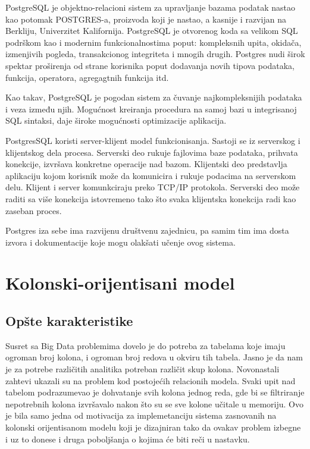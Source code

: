 \documentclass[12pt,oneside]{memoir}
\begin{document}
PostgreSQL je objektno-relacioni sistem za upravljanje bazama podatak nastao kao potomak POSTGRES-a, proizvoda koji je nastao, a kasnije i razvijan na Berkliju, Univerzitet Kalifornija. PostgreSQL je otvorenog koda sa velikom SQL podrškom kao i modernim funkcionalnostima poput: kompleksnih upita, okidača, izmenjivih pogleda, transakcionog integriteta i mnogih drugih. Postgres nudi širok spektar proširenja od strane korisnika poput dodavanja novih tipova podataka, funkcija, operatora, agregagtnih funkcija itd. 

Kao takav, PostgreSQL je pogodan sistem za čuvanje najkompleksnijih podataka i veza između njih. Mogućnost kreiranja procedura na samoj bazi u integrisanoj SQL sintaksi, daje široke mogućnosti optimizacije aplikacija. 

PostgresSQL koristi server-klijent model funkcionisanja. Sastoji se iz serverskog i klijentskog dela procesa. Serverski deo rukuje fajlovima baze podataka, prihvata konekcije, izvršava konkretne operacije nad bazom. Klijentski deo predstavlja aplikaciju kojom korisnik može da komunicira i rukuje podacima na serverskom delu. Klijent i server komunkciraju preko TCP/IP protokola. Serverski deo može raditi sa više konekcija istovremeno tako što svaka klijentska konekcija radi kao zaseban proces.

Postgres iza sebe ima razvijenu društvenu zajednicu, pa samim tim ima dosta izvora i dokumentacije koje mogu olakšati učenje ovog sistema.  \cite{PostgreSQLUpAndRunning}

\section{Kolonski-orijentisani model}
\subsection{Opšte karakteristike}
\cite{ColumnarOriented}
Susret sa Big Data problemima dovelo je do potreba za tabelama koje imaju ogroman broj kolona, i ogroman broj redova u okviru tih tabela. Jasno je da nam je za potrebe različitih analitika potreban različit skup kolona. Novonastali zahtevi ukazali su na problem kod postojećih  relacionih modela. Svaki upit nad tabelom podrazumevao je dohvatanje svih kolona jednog reda, gde bi se filtriranje nepotrebnih kolona izvršavalo nakon što su se sve kolone učitale u memoriju. Ovo je bila samo jedna od motivacija za implemetanciju sistema zasnovanih na kolonski orijentisanom modelu koji je dizajniran tako da ovakav problem izbegne i uz to donese i druga poboljšanja o kojima će biti reči u nastavku.
\end{document}

